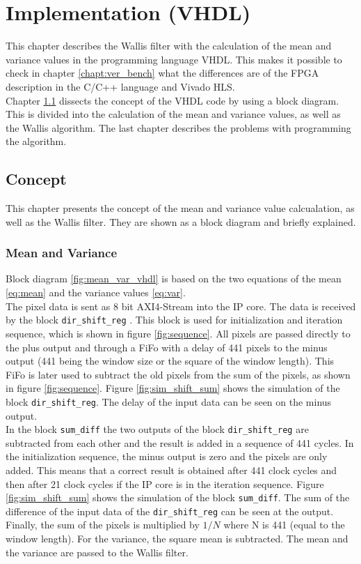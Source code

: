 \section{Implementation (VHDL)} \label{ch:ip:imp_vhdl}
This chapter describes the Wallis filter with the calculation of the mean and
variance values in the programming language VHDL. This makes it possible to
check in chapter \ref{chapt:ver_bench} what the differences are of the FPGA
description in the C/C++ language and Vivado HLS. \\
Chapter \ref{ch:concept_vhdl} dissects the concept of the VHDL code by using a
block diagram. This is divided into the calculation of the mean and variance
values, as well as the Wallis algorithm. The last chapter describes the
problems with programming the algorithm.

\subsection{Concept} \label{ch:concept_vhdl}
This chapter presents the concept of the mean and variance value
calcualation, as well as the Wallis filter. They are shown as a block diagram and briefly explained.

\subsubsection*{Mean and Variance}
Block diagram \ref{fig:mean_var_vhdl} is based on the two equations of the mean 
\ref{eq:mean} and the variance values \ref{eq:var}. \\
The pixel data is sent as 8 bit AXI4-Stream into the IP core. The data is
received by the block \texttt{dir\_shift\_reg} . This block is used for
initialization and iteration sequence, which is shown in figure 
\ref{fig:sequence}. All pixels are passed directly to the plus output and
through a FiFo with a delay of 441 pixels to the minus output (441 being the
window size or the
square of the window length). This FiFo is later used to subtract the
old pixels from the sum of the pixels, as shown in figure \ref{fig:sequence}.
Figure \ref{fig:sim_shift_sum}
shows the simulation of the block \texttt{dir\_shift\_reg}. The delay of the
input data can be seen on the minus output. \\
In the block \texttt{sum\_diff} the two outputs of the block 
\texttt{dir\_shift\_reg} are subtracted from each other and the result is
added in a sequence of 441 cycles. In the initialization sequence, the minus
output is zero and the pixels are only added. This means that a correct result
is obtained after 441 clock cycles and then after 21 clock cycles if the
IP core is in the iteration sequence. Figure \ref{fig:sim_shift_sum} shows the
simulation of the block \texttt{sum\_diff}. The sum of the difference of the
input data of the \texttt{dir\_shift\_reg} can be seen at the output.\\
Finally, the sum of the pixels is multiplied by $1/N$ where N is 441 (equal to
the window length). For the variance, the square mean is subtracted. The mean
and the variance are passed to the Wallis filter.

